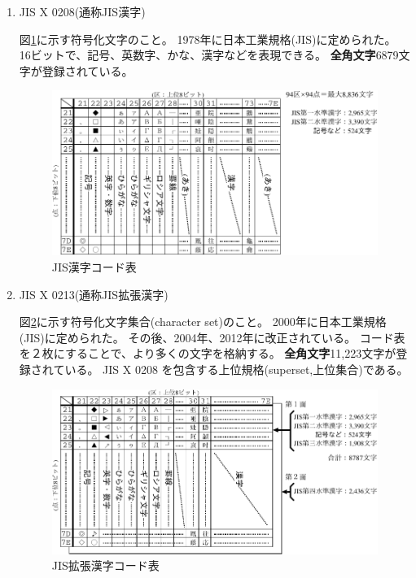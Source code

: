 \documentclass[a4j,dvipdfmx]{jarticle}
\begin{document}
\begin{enumerate}
\begin{enumerate}
\newpage

\item JIS X 0208(通称JIS漢字)

図\ref{fig4}に示す符号化文字のこと。
1978年に日本工業規格(JIS)に定められた。
16ビットで、記号、英数字、かな、漢字などを表現できる。
{\bf 全角文字}6879文字が登録されている。

\begin{figure}[hbtp]
\begin{center}
\includegraphics[scale=0.9]{jisx0208.pdf}
\caption{JIS漢字コード表}
\label{fig4}
\end{center}
\end{figure}

\item JIS X 0213(通称JIS拡張漢字)

図\ref{fig5}に示す符号化文字集合(character set)のこと。
2000年に日本工業規格(JIS)に定められた。
その後、2004年、2012年に改正されている。
コード表を２枚にすることで、より多くの文字を格納する。
{\bf 全角文字}11,223文字が登録されている。
JIS X 0208 を包含する上位規格(superset,上位集合)である。

\begin{figure}[hbtp]
\begin{center}
\includegraphics[scale=0.9]{jisx0213.pdf}
\caption{JIS拡張漢字コード表}
\label{fig5}
\end{center}
\end{figure}


\end{enumerate}
\end{enumerate}
\end{document}
